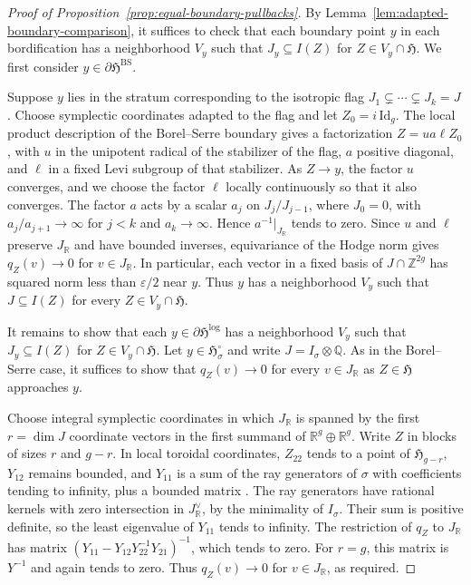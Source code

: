 \documentclass[12 pt]{amsart}
\newcommand{\fH}{\mathfrak H}
\newcommand{\QQ}{\mathbb{Q}}
\newcommand{\RR}{\mathbb{R}}
\newcommand{\ZZ}{\mathbb{Z}}
\newcommand{\BS}{\mathrm{BS}}
\newcommand{\<}{\langle}
\renewcommand{\>}{\rangle}
\theoremstyle{definition}
\begin{document}
\begin{proof}[Proof of Proposition~\ref{prop:equal-boundary-pullbacks}]
By Lemma~\ref{lem:adapted-boundary-comparison}, it suffices to check that each boundary point $y$ in each bordification has a neighborhood $V_y$ such that $J_y \subseteq I(Z)$ for $Z \in V_y \cap \fH$. We first consider $y \in \partial \fH^{\BS}$. 

Suppose $y$ lies in the stratum corresponding to the isotropic flag $J_1 \subsetneq \cdots \subsetneq J_k = J$. Choose symplectic coordinates adapted to the flag and let $Z_0 = i \, \mathrm{Id}_g$. The local product description of the Borel--Serre boundary \cite[\S5.4]{BorelSerre} gives a factorization $Z = u a \ell Z_0$, with $u$ in the unipotent radical of the stabilizer of the flag, $a$ positive diagonal, and $\ell$ in a fixed Levi subgroup of that stabilizer. As $Z \to y$, the factor $u$ converges, and we choose the factor $\ell$ locally continuously so that it also converges. The factor $a$ acts by a scalar $a_j$ on $J_j/J_{j - 1}$, where $J_0 = 0$, with $a_j/a_{j + 1} \to \infty$ for $j < k$ and $a_k \to \infty$. Hence $a^{-1}|_{J_\RR}$ tends to zero. Since $u$ and $\ell$ preserve $J_\RR$ and have bounded inverses, equivariance of the Hodge norm gives $q_Z(v) \to 0$ for $v \in J_\RR$. In particular, each vector in a fixed basis of $J \cap \ZZ^{2g}$ has squared norm less than $\varepsilon/2$ near $y$. Thus $y$ has a neighborhood $V_y$ such that $J \subseteq I(Z)$ for every $Z \in V_y \cap \fH$.

It remains to show that each $y \in \partial \fH^{\log}$ has a neighborhood $V_y$ such that $J_y \subseteq I(Z)$ for $Z \in V_y \cap \fH$. Let $y \in \fH_\sigma^\circ$ and write $J = I_\sigma \otimes \QQ$. As in the Borel--Serre case, it suffices to show that $q_Z(v) \to 0$ for every $v \in J_\RR$ as $Z \in \fH$ approaches $y$.

Choose integral symplectic coordinates in which $J_\RR$ is spanned by the first $r = \dim J$ coordinate vectors in the first summand of $\RR^g \oplus \RR^g$. Write $Z$ in blocks of sizes $r$ and $g - r$. In local toroidal coordinates, $Z_{22}$ tends to a point of $\fH_{g - r}$, $Y_{12}$ remains bounded, and $Y_{11}$ is a sum of the ray generators of $\sigma$ with coefficients tending to infinity, plus a bounded matrix \cite[Chapter~III, \S5]{AMRT}. The ray generators have rational kernels with zero intersection in $J_\RR^\vee$, by the minimality of $I_\sigma$. Their sum is positive definite, so the least eigenvalue of $Y_{11}$ tends to infinity. The restriction of $q_Z$ to $J_\RR$ has matrix $(Y_{11} - Y_{12} Y_{22}^{-1} Y_{21})^{-1}$, which tends to zero. For $r = g$, this matrix is $Y^{-1}$ and again tends to zero. Thus $q_Z(v) \to 0$ for $v \in J_\RR$, as required.
\end{proof}
\end{document}
